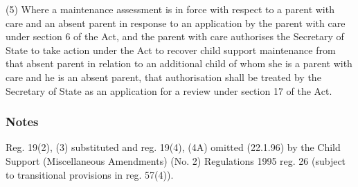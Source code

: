 \documentclass[a4paper]{article}
\newcommand\amendment[1]{\subsubsection*{Notes}{\itshape\frenchspacing\footnotesize #1 \par}}
\begin{document}
%
%
%
%


(5) Where a maintenance assessment is in force with respect to a parent with care and an absent parent in response to an application by the parent with care under section 6 of the Act, and the parent with care authorises the Secretary of State to take action under the Act to recover child support maintenance from that absent parent in relation to an additional child of whom she is a parent with care and he is an absent parent, that authorisation shall be treated by the Secretary of State as an application for a review under section 17 of the Act.

\amendment{


Reg. 19(2), (3) substituted and reg. 19(4), (4A) omitted (22.1.96) by the Child Support (Miscellaneous Amendments) (No. 2) Regulations 1995 reg. 26 (subject to transitional provisions in reg. 57(4)). 
}
\end{document}
